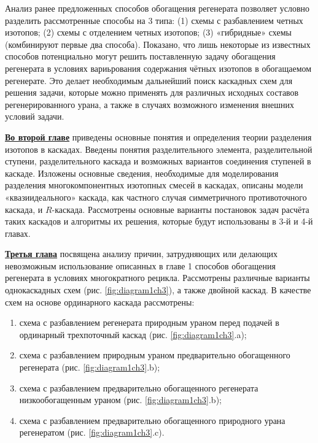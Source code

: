 Анализ ранее предложенных способов обогащения регенерата позволяет условно разделить рассмотренные способы на 3 типа: (1) схемы с разбавлением четных изотопов; (2) схемы с отделением четных изотопов; (3) «гибридные» схемы (комбинируют первые два способа).
Показано, что лишь некоторые из известных способов потенциально могут решить поставленную задачу обогащения регенерата в условиях вариьрования содержания чётных изотопов в обогащаемом регенерате. Это делает необходимым дальнейший поиск каскадных схем для решения задачи, которые можно применять для различных исходных составов регенерированного урана, а также в случаях возможного изменения внешних условий задачи. 

\underline{\textbf{Во второй главе}} приведены основные понятия и определения теории разделения изотопов в каскадах. Введены понятия  разделительного элемента, разделительной ступени, разделительного каскада и возможных вариантов соединения ступеней в каскаде. Изложены основные сведения, необходимые для моделирования разделения многокомпонентных изотопных смесей в каскадах, описаны модели «квазиидеального» каскада, как частного случая симметричного противоточного каскада, и $R$-каскада. Рассмотрены основные варианты постановок задач расчёта таких каскадов и алгоритмы их решения, которые будут использованы в 3-й и 4-й главах. 

\underline{\textbf{Третья глава}} посвящена анализу причин, затрудняющих или делающих невозможным использование описанных в главе 1 способов обогащения регенерата в условиях многократного рецикла. Рассмотрены различные варианты однокаскадных схем (рис. \ref{fig:diagram1ch3}), а также двойной каскад. В качестве схем на основе ординарного каскада рассмотрены:

\begin{enumerate}
  \item схема с разбавлением регенерата природным ураном перед подачей в ординарный трехпоточный каскад (рис. \ref{fig:diagram1ch3}.a);
  \item схема с разбавлением природным ураном предварительно обогащенного регенерата (рис. \ref{fig:diagram1ch3}.b);
  \item схема с разбавлением предварительно обогащенного регенерата низкообогащенным ураном (рис. \ref{fig:diagram1ch3}.b);
  \item схема с разбавлением предварительно обогащенного природного урана регенератом (рис. \ref{fig:diagram1ch3}.c).
  
\end{enumerate}

